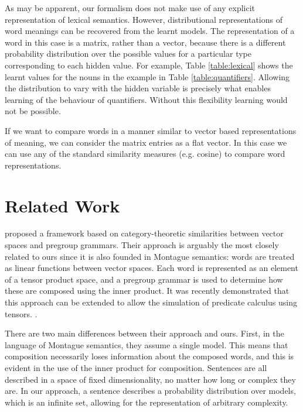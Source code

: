 \documentclass[letterpaper]{article}
\newcommand{\citet}[1]{\newcite{#1}}
\begin{document}
As may be apparent, our formalism does not make use of any explicit representation of
lexical semantics. However, distributional representations of word
meanings can be recovered from the learnt models. The representation
of a word in this case is a matrix, rather than a vector, because there is a different 
probability distribution over the possible values for a particular
type corresponding to each hidden value. For example, Table \ref{table:lexical} shows the learnt
values for the nouns in the example in Table
\ref{table:quantifiers}. Allowing the distribution to vary with the
hidden variable is precisely what enables learning of the behaviour of
quantifiers. Without this flexibility learning would not be possible.

If we want to compare words in a manner similar to vector based
representations of meaning, we can consider the matrix entries as a
flat vector. In this case we can use any of the standard similarity measures (e.g. 
cosine) to compare word representations.

\section{Related Work}


\citet{Coecke:10} proposed a framework based on category-theoretic
similarities between vector spaces and pregroup grammars. Their
approach is arguably the most closely related to ours since it is also
founded in Montague semantics: words are treated as linear functions
between vector spaces. Each word is represented as an element of a
tensor product space, and a pregroup grammar is used to determine how
these are composed using the inner product. It was recently
demonstrated that this approach can be extended to allow the
simulation of predicate calculus using
tensors. \cite{Grefenstette:13}.

There are two main differences between their approach and ours. First,
in the language of Montague semantics, they assume a single
model. This means that composition necessarily loses information about
the composed words, and this is evident in the use of the inner
product for composition. Sentences are all described in a space of
fixed dimensionality, no matter how long or complex they are. In our
approach, a sentence describes a probability distribution over models,
which is an infinite set, allowing for the representation of arbitrary
complexity.
\end{document}

